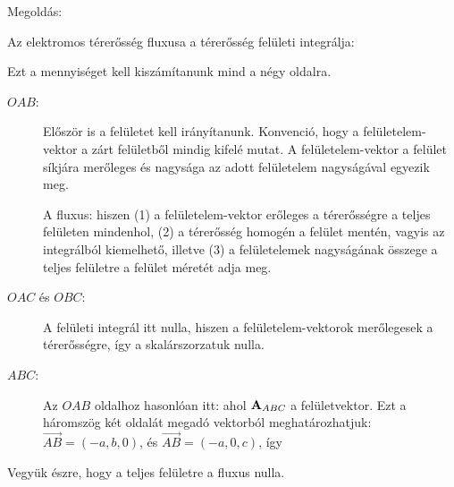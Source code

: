 
\ifdefined\megoldas
  
 Megoldás: 

 Az elektromos térerősség fluxusa a térerősség felületi integrálja:

 Ezt a mennyiséget kell kiszámítanunk mind a négy oldalra.
 \begin{description}
   \item[$OAB$:] 
    Először is a felületet kell irányítanunk. Konvenció, hogy a felületelem-vektor a zárt felületből mindig kifelé mutat. A felületelem-vektor a felület síkjára merőleges és nagysága az adott felületelem nagyságával egyezik meg.
    
    A fluxus:
    hiszen (1) a felületelem-vektor erőleges a térerősségre a teljes felületen mindenhol, (2) a térerősség homogén a felület mentén, vagyis az integrálból kiemelhető, illetve (3) a felületelemek nagyságának összege a teljes felületre a felület méretét adja meg. 
 \end{description}

 \begin{description}
  \item[$OAC$ és $OBC$:] 
   A felületi integrál itt nulla, hiszen a felületelem-vektorok merőlegesek a térerősségre, így a skalárszorzatuk nulla. 
   
  \item[$ABC$:]
   Az $OAB$ oldalhoz hasonlóan itt:
   ahol $\mathbf{A}_{ABC}$ a felületvektor. Ezt a háromszög két oldalát megadó vektorból meghatározhatjuk: $\overrightarrow{AB}=(-a,b,0)$, és $\overrightarrow{AB}=(-a,0,c)$, így 
 \end{description}

 Vegyük észre, hogy a teljes felületre a fluxus nulla.

\fi